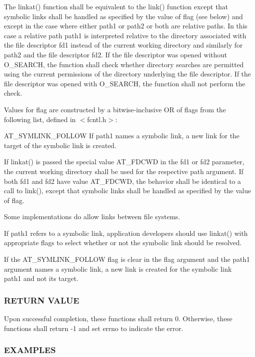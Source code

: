 The linkat() function shall be equivalent to the link() function except that symbolic links shall be handled as specified by the value of flag (see below) and except in the case where either path1 or path2 or both are relative paths. In this case a relative path path1 is interpreted relative to the directory associated with the file descriptor fd1 instead of the current working directory and similarly for path2 and the file descriptor fd2. If the file descriptor was opened without O\+\_\+\+S\+E\+A\+R\+CH, the function shall check whether directory searches are permitted using the current permissions of the directory underlying the file descriptor. If the file descriptor was opened with O\+\_\+\+S\+E\+A\+R\+CH, the function shall not perform the check.

Values for flag are constructed by a bitwise-\/inclusive OR of flags from the following list, defined in $<$fcntl.\+h$>$\+:

A\+T\+\_\+\+S\+Y\+M\+L\+I\+N\+K\+\_\+\+F\+O\+L\+L\+OW If path1 names a symbolic link, a new link for the target of the symbolic link is created.

If linkat() is passed the special value A\+T\+\_\+\+F\+D\+C\+WD in the fd1 or fd2 parameter, the current working directory shall be used for the respective path argument. If both fd1 and fd2 have value A\+T\+\_\+\+F\+D\+C\+WD, the behavior shall be identical to a call to link(), except that symbolic links shall be handled as specified by the value of flag.

Some implementations do allow links between file systems.

If path1 refers to a symbolic link, application developers should use linkat() with appropriate flags to select whether or not the symbolic link should be resolved.

If the A\+T\+\_\+\+S\+Y\+M\+L\+I\+N\+K\+\_\+\+F\+O\+L\+L\+OW flag is clear in the flag argument and the path1 argument names a symbolic link, a new link is created for the symbolic link path1 and not its target.

\subsubsection*{R\+E\+T\+U\+RN V\+A\+L\+UE}

Upon successful completion, these functions shall return 0. Otherwise, these functions shall return -\/1 and set errno to indicate the error.

\subsubsection*{E\+X\+A\+M\+P\+L\+ES}

